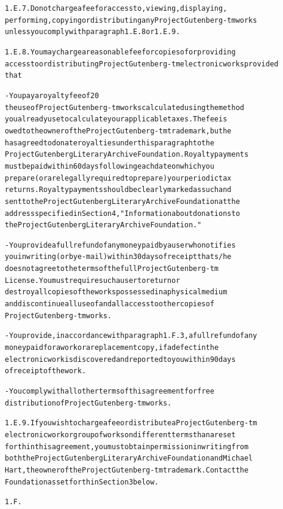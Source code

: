 \documentclass[12pt]{book}[2005/09/16]
\newenvironment{PGtext}{%
\begin{alltt}
\fontsize{8.1}{9}\ttfamily\selectfont}%
{\end{alltt}}
\begin{document}
\begin{PGtext}
1.E.7.  Do not charge a fee for access to, viewing, displaying,
performing, copying or distributing any Project Gutenberg-tm works
unless you comply with paragraph 1.E.8 or 1.E.9.

1.E.8.  You may charge a reasonable fee for copies of or providing
access to or distributing Project Gutenberg-tm electronic works provided
that

- You pay a royalty fee of 20%
     the use of Project Gutenberg-tm works calculated using the method
     you already use to calculate your applicable taxes.  The fee is
     owed to the owner of the Project Gutenberg-tm trademark, but he
     has agreed to donate royalties under this paragraph to the
     Project Gutenberg Literary Archive Foundation.  Royalty payments
     must be paid within 60 days following each date on which you
     prepare (or are legally required to prepare) your periodic tax
     returns.  Royalty payments should be clearly marked as such and
     sent to the Project Gutenberg Literary Archive Foundation at the
     address specified in Section 4, "Information about donations to
     the Project Gutenberg Literary Archive Foundation."

- You provide a full refund of any money paid by a user who notifies
     you in writing (or by e-mail) within 30 days of receipt that s/he
     does not agree to the terms of the full Project Gutenberg-tm
     License.  You must require such a user to return or
     destroy all copies of the works possessed in a physical medium
     and discontinue all use of and all access to other copies of
     Project Gutenberg-tm works.

- You provide, in accordance with paragraph 1.F.3, a full refund of any
     money paid for a work or a replacement copy, if a defect in the
     electronic work is discovered and reported to you within 90 days
     of receipt of the work.

- You comply with all other terms of this agreement for free
     distribution of Project Gutenberg-tm works.

1.E.9.  If you wish to charge a fee or distribute a Project Gutenberg-tm
electronic work or group of works on different terms than are set
forth in this agreement, you must obtain permission in writing from
both the Project Gutenberg Literary Archive Foundation and Michael
Hart, the owner of the Project Gutenberg-tm trademark.  Contact the
Foundation as set forth in Section 3 below.

1.F.


\end{PGtext}
\end{document}
